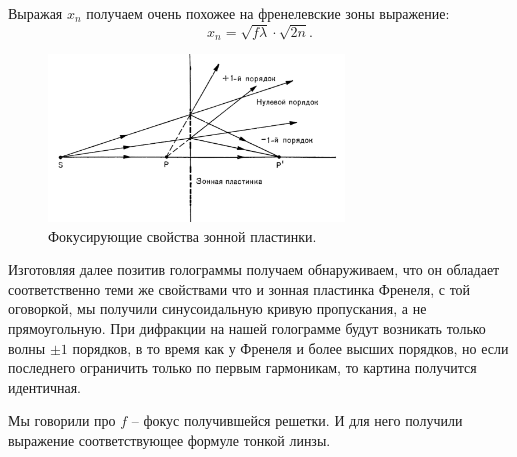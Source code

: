  Выражая $x_n$ получаем очень похожее на френелевские зоны выражение:
 \begin{equation*}
 	x_n = \sqrt{f \lambda} \cdot \sqrt{2 n}.
 \end{equation*}

 \begin{figure}[h]
     \centering
     \includegraphics[width=0.7\textwidth]{figures/vosstan_gabor.png}
     \caption{Фокусирующие свойства зонной пластинки.}
 \end{figure}
 Изготовляя далее позитив голограммы получаем обнаруживаем, что он обладает соответственно теми же свойствами что и зонная пластинка Френеля, с той оговоркой, мы получили синусоидальную кривую пропускания, а не прямоугольную. При дифракции на нашей голограмме будут возникать только волны $\pm 1$ порядков, в то время как у Френеля и более высших порядков, но если последнего ограничить только по первым гармоникам, то картина получится идентичная.

 Мы говорили про $f$ -- фокус получившейся решетки. И для него получили выражение соответствующее формуле тонкой линзы.